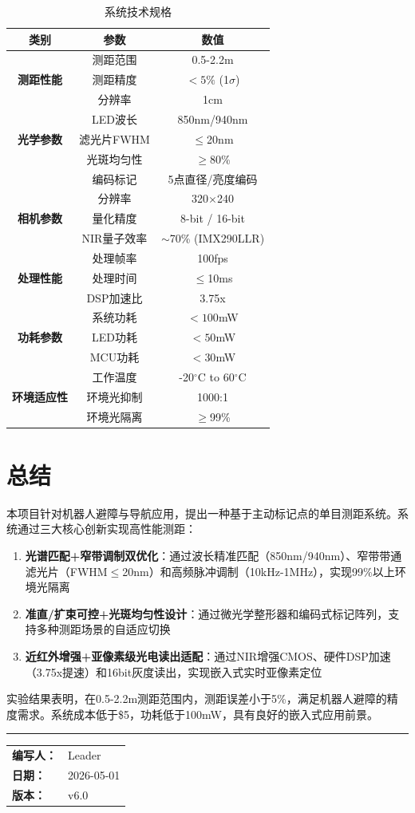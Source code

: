 \documentclass[12pt, a4paper]{ctexart}
\begin{document}
\begin{table}[htbp]
\centering
\caption{系统技术规格}
\begin{tabular}{ccc}
\toprule
类别 & 参数 & 数值 \\
\midrule
 & 测距范围 & 0.5-2.2m \\
\textbf{测距性能} & 测距精度 & $<5\%$ (1$\sigma$) \\
 & 分辨率 & 1cm \\
 & LED波长 & 850nm/940nm \\
\textbf{光学参数} & 滤光片FWHM & $\le$20nm \\
 & 光斑均匀性 & $\ge$80\% \\
 & 编码标记 & 5点直径/亮度编码 \\
 & 分辨率 & 320$\times$240 \\
\textbf{相机参数} & 量化精度 & 8-bit / 16-bit \\
 & NIR量子效率 & $\sim$70\% (IMX290LLR) \\
 & 处理帧率 & 100fps \\
\textbf{处理性能} & 处理时间 & $\le$10ms \\
 & DSP加速比 & 3.75x \\
 & 系统功耗 & $<100$mW \\
\textbf{功耗参数} & LED功耗 & $<50$mW \\
 & MCU功耗 & $<30$mW \\
 & 工作温度 & -20$^\circ$C to 60$^\circ$C \\
\textbf{环境适应性} & 环境光抑制 & 1000:1 \\
 & 环境光隔离 & $\ge$99\% \\
\bottomrule
\end{tabular}
\end{table}

\section{总结}

本项目针对机器人避障与导航应用，提出一种基于主动标记点的单目测距系统。系统通过三大核心创新实现高性能测距：

\begin{enumerate}
\item \textbf{光谱匹配+窄带调制双优化}：通过波长精准匹配（850nm/940nm）、窄带带通滤光片（FWHM$\le$20nm）和高频脉冲调制（10kHz-1MHz），实现99\%以上环境光隔离
\item \textbf{准直/扩束可控+光斑均匀性设计}：通过微光学整形器和编码式标记阵列，支持多种测距场景的自适应切换
\item \textbf{近红外增强+亚像素级光电读出适配}：通过NIR增强CMOS、硬件DSP加速（3.75x提速）和16bit灰度读出，实现嵌入式实时亚像素定位
\end{enumerate}

实验结果表明，在0.5-2.2m测距范围内，测距误差小于5\%，满足机器人避障的精度需求。系统成本低于\$5，功耗低于100mW，具有良好的嵌入式应用前景。

\bigskip
\hrule
\bigskip

\begin{center}
\begin{tabular}{ll}
\textbf{编写人：} & Leader \\
\textbf{日期：} & 2026-05-01 \\
\textbf{版本：} & v6.0 \\
\end{tabular}
\end{center}
\end{document}
